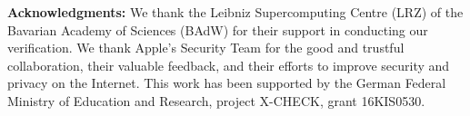 \textbf{Acknowledgments: }
We thank the Leibniz Supercomputing Centre (LRZ) of the Bavarian Academy of
Sciences (BAdW) for their support in conducting our verification. We thank
Apple's Security Team for the good and trustful collaboration, their valuable feedback, and their efforts
to improve security and privacy on the Internet.
This work has been supported by the German Federal Ministry of Education
and Research, project X-CHECK, grant 16KIS0530.
